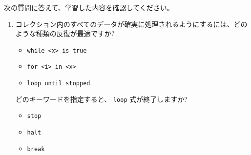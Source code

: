 次の質問に答えて、学習した内容を確認してください。

\begin{enumerate}

\item コレクション内のすべてのデータが確実に処理されるようにするには、どのような種類の反復が最適ですか?
\begin{itemize}
\item \texttt{while <x> is true}

\item \texttt{for <i> in <x>}

\item \texttt{loop until stopped}
\end{itemize}

どのキーワードを指定すると、 \texttt{loop} 式が終了しますか?
\begin{itemize}
\item \texttt{stop}

\item \texttt{halt}

\item \texttt{break}
\end{itemize}

\end{enumerate}